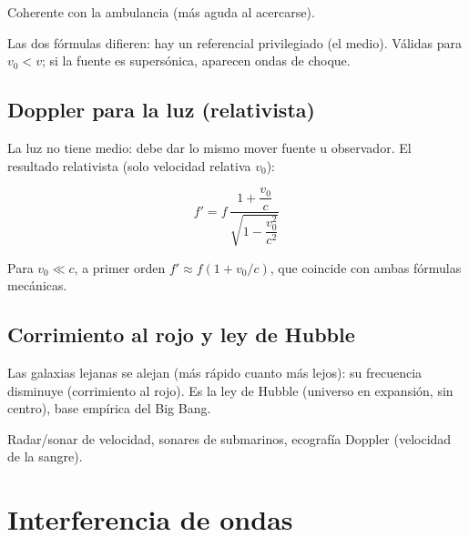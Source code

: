 \documentclass[12pt,a4paper]{article}
\begin{document}
Coherente con la ambulancia (más aguda al acercarse).



\begin{warnbox}[No coinciden]
  Las dos fórmulas difieren: hay un referencial privilegiado (el medio). Válidas
  para $v_0 < v$; si la fuente es supersónica, aparecen ondas de choque.
\end{warnbox}

\subsection{Doppler para la luz (relativista)}

La luz no tiene medio: debe dar lo mismo mover fuente u observador. El resultado
relativista (solo velocidad relativa $v_0$):

\begin{keybox}
  \[
  \boxed{f' = f\,\frac{1 + \dfrac{v_0}{c}}{\sqrt{1 - \dfrac{v_0^2}{c^2}}}}
  \]
\end{keybox}

Para $v_0 \ll c$, a primer orden $f' \approx f(1 + v_0/c)$, que coincide con
ambas fórmulas mecánicas.



\subsection{Corrimiento al rojo y ley de Hubble}

Las galaxias lejanas se alejan (más rápido cuanto más lejos): su frecuencia
disminuye (corrimiento al rojo). Es la ley de Hubble (universo en expansión, sin
centro), base empírica del Big Bang.

\begin{notebox}
  Radar/sonar de velocidad, sonares de submarinos, ecografía Doppler (velocidad
  de la sangre).
\end{notebox}



\section{Interferencia de ondas}
\end{document}

